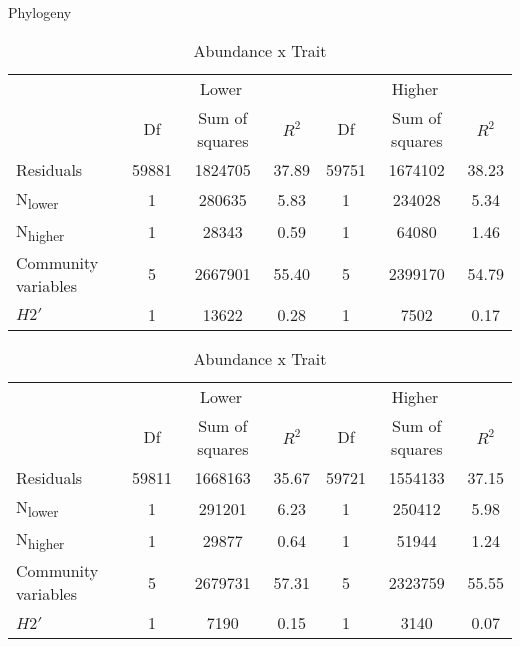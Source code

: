\documentclass[12pt,a4paper]{article}
\begin{document}
\begin{table}
\ContinuedFloat
    \begin{subtable}{\linewidth}
    \caption{Phylogeny}
    \centering
\begin{tabularx}{\linewidth}{@{} X *6{c} @{}}
\toprule
  & \multicolumn{3}{c}{Lower} & \multicolumn{3}{c}{Higher} \\ \cmidrule(l){2-4} \cmidrule(l){5-7}
  						& Df		& Sum of squares	& $R^2$	& Df 	& Sum of squares	& $R^2$ \\ \midrule
Residuals 				& 59881 & 1824705		& 37.89 	& 59751 & 1674102 		& 38.23   \\
N\textsubscript{lower} 	& 1 		& 280635			& 5.83 	& 1		& 234028 			& 5.34  \\
N\textsubscript{higher} 	& 1 		& 28343				& 0.59	& 1 		& 64080 			& 1.46  \\
Community variables 		& 5 		& 2667901 		& 55.40 	& 5 		& 2399170			& 54.79  \\
$H2'$ 					& 1 		& 13622 			& 0.28 	& 1 		& 7502			& 0.17 \\ \bottomrule
\end{tabularx}
\end{subtable}

\medskip
    \begin{subtable}{\linewidth}
    \caption{Abundance x Trait}
    \centering
\begin{tabularx}{\linewidth}{@{} X *6{c} @{}}
\toprule
  & \multicolumn{3}{c}{Lower} & \multicolumn{3}{c}{Higher} \\ \cmidrule(l){2-4} \cmidrule(l){5-7}
  						& Df		& Sum of squares	& $R^2$	& Df 	& Sum of squares	& $R^2$ \\ \midrule
Residuals 				& 59811 & 1668163		& 35.67	& 59721 & 1554133 		& 37.15   \\
N\textsubscript{lower} 	& 1 		& 291201 		& 6.23 	& 1		& 250412			& 5.98  \\
N\textsubscript{higher} 	& 1 		& 29877			& 0.64	& 1 		& 51944 			& 1.24  \\
Community variables 		& 5 		& 2679731 		& 57.31 	& 5 		& 2323759			& 55.55  \\
$H2'$ 					& 1 		& 7190			& 0.15 	& 1 		& 3140	& 0.07 \\ \bottomrule
\end{tabularx}
\end{subtable}


\end{table}
\end{document}
